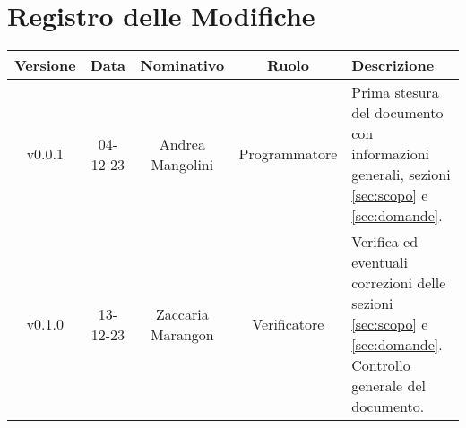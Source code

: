\section*{\Large Registro delle Modifiche}
    \begin{table}[h]
        \centering
        \renewcommand\tabularxcolumn[1]{m{#1}} %
        \renewcommand{\arraystretch}{1.5}
        \begin{tabularx}{0.98\textwidth}
            {c|c|c|c|>{\centering\arraybackslash}X}
            \rowcolor{black}
            \textbf{\color{white} Versione} & \textbf{\color{white} Data} & \textbf{\color{white} Nominativo} & \textbf{\color{white} Ruolo} & \textbf{\color{white} Descrizione} \\ 
            \hline

            v0.0.1 & 04-12-23 & Andrea Mangolini & Programmatore & Prima stesura del documento con informazioni generali, sezioni \ref{sec:scopo} e \ref{sec:domande}. \\
            v0.1.0 & 13-12-23 & Zaccaria Marangon & Verificatore & Verifica ed eventuali correzioni delle sezioni \ref{sec:scopo} e \ref{sec:domande}. Controllo generale del documento.  \\
            \hline
        \end{tabularx}
    \end{table}